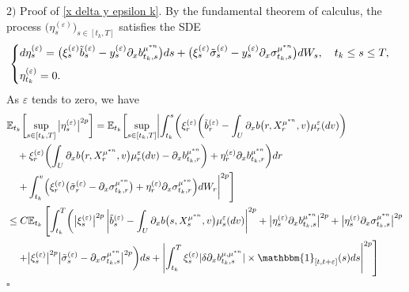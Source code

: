 \documentclass[12pt]{article}
\theoremstyle{named}
\numberwithin{equation}{section}
\newcommand{\abs}[1]{\lvert#1\rvert}
\newenvironment{Proof}{\removelastskip\par\medskip \noindent{\em Proof.} \rm}{\penalty-20\null\hfill$\square$\par\medbreak}
\begin{document}
\begin{Proof}
\noindent
$2)$ Proof of \eqref{x delta y epsilon k}.
By the fundamental theorem of calculus,
the process $\big(\eta^{(\varepsilon)}_s\big)_{s\in [t_k,T]}$ satisfies the SDE
$$
\begin{cases}
d\eta^{(\varepsilon)}_s = \big(\xi^{(\varepsilon)}_s \tilde{b}^{(\varepsilon )}_s  - y^{(\varepsilon)}_s\partial_xb^{\mu^{*n} }_{t_k ,s}  \big) ds + \big(\xi^{(\varepsilon)}_s \tilde{\sigma}^{(\varepsilon )}_s  - y^{(\varepsilon)}_s\partial_x \sigma^{\mu^{*n} }_{t_k ,s} \big) dW_s, \quad t_k \leq s \leq T,
\medskip
\\
\eta^{(\varepsilon)}_{t_k} = 0.
\end{cases}
$$
 As $\varepsilon$ tends to zero, we have
\begin{align}
  & \mathbb{E}_{t_k}\biggl[\sup\limits_{s \in [t_k,T]}
    \big|\eta^{(\varepsilon)}_s\big|^{2p}
    \biggr]
  = \mathbb{E}_{t_k} \biggl[ \sup\limits_{s \in [t_k,T]}
    \biggl|
    \int_{t_k}^s \biggl(
    \xi^{(\varepsilon)}_r
    \biggl(
    \tilde{b}^{(\varepsilon )}_r - \int_U \partial_xb\bigl(r, X^{\mu^{*n}}_r, v\bigr) \mu^\varepsilon _r(dv)\biggr)
    \nonumber\\
    & \quad
     + \xi^{(\varepsilon)}_r\biggl(
    \int_U \partial_xb\bigl(r, X^{\mu^{*n}}_r, v\bigr) \mu^\varepsilon _r(dv) - \partial_xb^{\mu^{*n} }_{t_k ,r}\biggr)
    + \eta^{(\varepsilon)}_r\partial_xb^{\mu^{*n} }_{t_k ,r} \biggr) dr
    \nonumber\\
    & \left.
    \quad
      + \int_{t_k}^v \Bigl(\xi^{(\varepsilon)}_r\bigl( \tilde{\sigma}^{(\varepsilon )}_r - \partial_x \sigma^{\mu^{*n} }_{t_k ,r}\bigr)
    +
    \eta^{(\varepsilon)}_r\partial_x \sigma^{\mu^{*n} }_{t_k ,r} \Bigr) dW_r\biggr|^{2p}
    \right]
  \nonumber\\
  & \leq C \mathbb{E}_{t_k}
  \left[
    \int_{t_k}^T \biggl(\big|\xi^{(\varepsilon)}_s\big|^{2p}\left|
     \tilde{b}^{(\varepsilon )}_s - \int_U \partial_xb\bigl(s, X^{\mu^{*n}}_s, v\bigr) \mu^\varepsilon _s(dv)
    \right|^{2p} + \bigl|\eta^{(\varepsilon)}_s\partial_xb^{\mu^{*n} }_{t_k ,s}\bigr|^{2p} + \bigl|\eta^{(\varepsilon)}_s\partial_x\sigma^{\mu^{*n} }_{t_k ,s}\bigr|^{2p}
    \right.
    \nonumber\\
    &
    \left.
    \quad
    + \big|\xi^{(\varepsilon)}_s\big|^{2p}\big| \tilde{\sigma}^{(\varepsilon )}_s - \partial_x \sigma^{\mu^{*n} }_{t_k ,s}\big|^{2p} \biggr) ds
    +
    \left|\int_{t_k}^T
\xi^{(\varepsilon)}_s\abs{\delta \partial_xb^{\mu,\mu^{*n} }_{t_k ,s}}\times\mathbbm{1}_{[t,t+\varepsilon]}(s) ds \right|^{2p} \right] \nonumber
    \\

\end{align}
\end{Proof}
\end{document}

